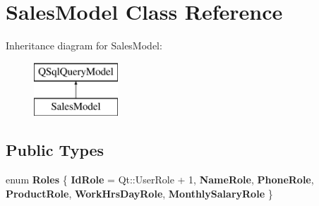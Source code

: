 \hypertarget{class_sales_model}{}\section{Sales\+Model Class Reference}
\label{class_sales_model}
Inheritance diagram for Sales\+Model\+:\begin{figure}[H]
\begin{center}
\leavevmode
\includegraphics[height=2.000000cm]{class_sales_model}
\end{center}
\end{figure}
\subsection*{Public Types}
\begin{DoxyCompactItemize}
\item 
\mbox{\label{class_sales_model_a536c3f3fd1e875635d7cdc2f25128bf3}} 
enum {\bfseries Roles} \{ \newline
{\bfseries Id\+Role} = Qt\+:\+:User\+Role + 1, 
{\bfseries Name\+Role}, 
{\bfseries Phone\+Role}, 
{\bfseries Product\+Role}, 
\newline
{\bfseries Work\+Hrs\+Day\+Role}, 
{\bfseries Monthly\+Salary\+Role}
 \}
\end{DoxyCompactItemize}
